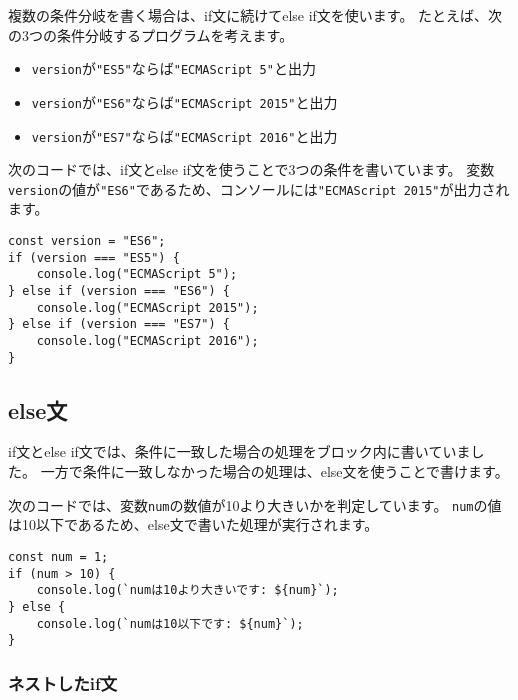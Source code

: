 複数の条件分岐を書く場合は、if文に続けてelse if文を使います。
たとえば、次の3つの条件分岐するプログラムを考えます。

\begin{itemize}
\item
  \texttt{version}が\texttt{"ES5"}ならば\texttt{"ECMAScript 5"}と出力
\item
  \texttt{version}が\texttt{"ES6"}ならば\texttt{"ECMAScript 2015"}と出力
\item
  \texttt{version}が\texttt{"ES7"}ならば\texttt{"ECMAScript 2016"}と出力
\end{itemize}

次のコードでは、if文とelse if文を使うことで3つの条件を書いています。
変数\texttt{version}の値が\texttt{"ES6"}であるため、コンソールには\texttt{"ECMAScript 2015"}が出力されます。

\begin{lstlisting}
const version = "ES6";
if (version === "ES5") {
    console.log("ECMAScript 5");
} else if (version === "ES6") {
    console.log("ECMAScript 2015");
} else if (version === "ES7") {
    console.log("ECMAScript 2016");
}
\end{lstlisting}

\hypertarget{else-statement}{%
\subsection{else文}\label{else-statement}}

if文とelse
if文では、条件に一致した場合の処理をブロック内に書いていました。
一方で条件に一致しなかった場合の処理は、else文を使うことで書けます。

次のコードでは、変数\texttt{num}の数値が10より大きいかを判定しています。
\texttt{num}の値は10以下であるため、else文で書いた処理が実行されます。

\enlargethispage{\baselineskip}\begin{lstlisting}
const num = 1;
if (num > 10) {
    console.log(`numは10より大きいです: ${num}`);
} else {
    console.log(`numは10以下です: ${num}`);
}
\end{lstlisting}

\hypertarget{nested-if-statement}{%
\subsubsection{ネストしたif文}\label{nested-if-statement}}

